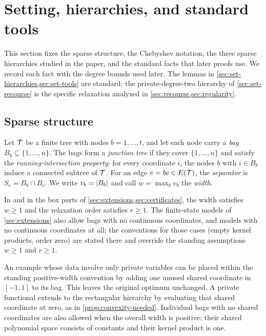 \section{Setting, hierarchies, and standard tools}\label{sec:setting}

This section fixes the sparse structure, the Chebyshev notation, the three
sparse hierarchies studied in the paper, and the standard facts that later
proofs use. We record each fact with the degree bounds used later. The
lemmas in \cref{sec:set-hierarchies,sec:set-tools} are standard; the
private-degree-two hierarchy of \cref{sec:set-recourse} is the specific
relaxation analyzed in \cref{sec:recourse,sec:regularity}.

\subsection{Sparse structure}\label{sec:set-sparse}

\begin{definition}\label{def:junction-tree}
Let $\mathcal{T}$ be a finite tree with nodes $b=1,\dots,t$, and let each node
carry a \emph{bag} $B_b\subseteq\{1,\dots,n\}$. The bags form a
\emph{junction tree} if they cover $\{1,\dots,n\}$ and satisfy the
\emph{running-intersection property}: for every coordinate $i$, the nodes
$b$ with $i\in B_b$ induce a connected subtree of $\mathcal{T}$. For an edge
$e=bc\in E(\mathcal{T})$, the \emph{separator} is $S_e=B_b\cap B_c$. We write
$v_b=\lvert B_b\rvert$ and call $w=\max_b v_b$ the \emph{width}.
\end{definition}

In  and in the box parts of
\cref{sec:extensions,sec:certificates}, the width satisfies $w\ge1$ and the
relaxation order satisfies $r\ge1$. The finite-state models of
\cref{sec:extensions} also allow bags with no continuous coordinates, and
models with no continuous coordinates at all; the conventions for those
cases (empty kernel products, order zero) are stated there and override the
standing assumptions $w\ge1$ and $r\ge1$.

An example whose data involve only private variables can be placed within
the standing positive-width convention by adding one unused shared
coordinate in $[-1,1]$ to its bag. This leaves the original optimum
unchanged. A private functional extends to the rectangular hierarchy by
evaluating that shared coordinate at zero, as in
\cref{prop:convexity-needed}. Individual bags with no shared coordinates are
also allowed when the overall width is positive; their shared polynomial
space consists of constants and their kernel product is one.

